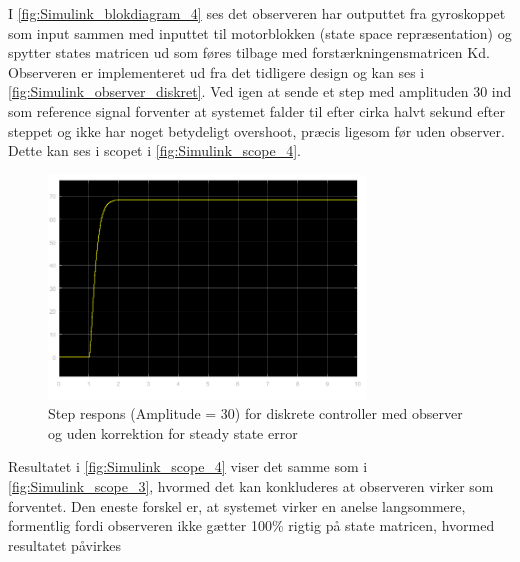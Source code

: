 I \autoref{fig:Simulink_blokdiagram_4} ses det observeren har outputtet fra gyroskoppet som input sammen med inputtet til motorblokken (state space repræsentation) og spytter states matricen ud som føres tilbage med forstærkningensmatricen Kd. Observeren er implementeret ud fra det tidligere design og kan ses i \autoref{fig:Simulink_observer_diskret}. Ved igen at sende et step med amplituden 30 ind som reference signal forventer at systemet falder til efter cirka halvt sekund efter steppet og ikke har noget betydeligt overshoot, præcis ligesom før uden observer. Dette kan ses i scopet i \autoref{fig:Simulink_scope_4}.

\begin{figure}[H]
	\centering
	\includegraphics[width = 0.75\textwidth]{figur/Simulink_scope_4}
	\caption{Step respons (Amplitude = 30) for diskrete controller med observer og uden korrektion for steady state error}
	\label{fig:Simulink_scope_4}
\end{figure}

Resultatet i \autoref{fig:Simulink_scope_4} viser det samme som i \autoref{fig:Simulink_scope_3}, hvormed det kan konkluderes at observeren virker som forventet. Den eneste forskel er, at systemet virker en anelse langsommere, formentlig fordi observeren ikke gætter 100\% rigtig på state matricen, hvormed resultatet påvirkes
 




